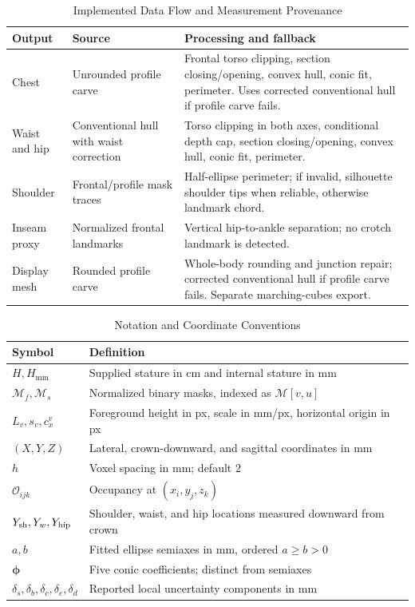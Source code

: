 \begin{table}[!t]
\caption{Implemented Data Flow and Measurement Provenance}
\label{tab:branch_provenance}
\centering\small
\begin{tabular}{p{2.2cm}p{5.7cm}p{7.7cm}}
\toprule
Output & Source & Processing and fallback \\
\midrule
Chest & Unrounded profile carve & Frontal torso clipping, section closing/opening, convex hull, conic fit, perimeter. Uses corrected conventional hull if profile carve fails. \\
Waist and hip & Conventional hull with waist correction & Torso clipping in both axes, conditional depth cap, section closing/opening, convex hull, conic fit, perimeter. \\
Shoulder & Frontal/profile mask traces & Half-ellipse perimeter; if invalid, silhouette shoulder tips when reliable, otherwise landmark chord. \\
Inseam proxy & Normalized frontal landmarks & Vertical hip-to-ankle separation; no crotch landmark is detected. \\
Display mesh & Rounded profile carve & Whole-body rounding and junction repair; corrected conventional hull if profile carve fails. Separate marching-cubes export. \\
\bottomrule
\end{tabular}
\end{table}

\begin{table}[!t]
\caption{Notation and Coordinate Conventions}
\label{tab:notation}
\centering\small
\begin{tabular}{lp{5.7cm}}
\toprule
Symbol & Definition \\
\midrule
$H,H_{\mathrm{mm}}$ & Supplied stature in cm and internal stature in mm \\
$\mathcal M_f,\mathcal M_s$ & Normalized binary masks, indexed as $\mathcal M[v,u]$ \\
$L_v,s_v,c_x^v$ & Foreground height in px, scale in mm/px, horizontal origin in px \\
$(X,Y,Z)$ & Lateral, crown-downward, and sagittal coordinates in mm \\
$h$ & Voxel spacing in mm; default $2$ \\
$\mathcal O_{ijk}$ & Occupancy at $(x_i,y_j,z_k)$ \\
$Y_{\rm sh},Y_w,Y_{\rm hip}$ & Shoulder, waist, and hip locations measured downward from crown \\
$a,b$ & Fitted ellipse semiaxes in mm, ordered $a\ge b>0$ \\
$\boldsymbol\phi$ & Five conic coefficients; distinct from semiaxes \\
$\delta_s,\delta_b,\delta_c,\delta_e,\delta_d$ & Reported local uncertainty components in mm \\
\bottomrule
\end{tabular}
\end{table}

